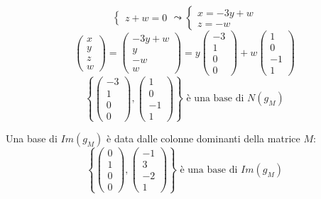 \documentclass[a4paper]{article}
\theoremstyle{break}
\theoremstyle{break}
\theoremstyle{break}
\theoremstyle{break}
\begin{document}
\begin{enumerate}
\[\begin{cases}
        z + w = 0
      \end{cases}
      \leadsto
      \begin{cases}
        x = -3y + w \\
        z = -w
      \end{cases}
    \]
    \[
    \begin{pmatrix} 
      x\\
      y\\
      z\\
      w
    \end{pmatrix} 
    =
    \begin{pmatrix} 
      -3y + w\\
      y\\
      -w\\
      w
    \end{pmatrix} 
    =
    y \begin{pmatrix} 
      -3\\
      1\\
      0\\
      0
    \end{pmatrix}
    + w \begin{pmatrix} 
      1\\
      0\\
      -1\\
      1
    \end{pmatrix}
    \] 
    \[
    \left\{ 
      \begin{pmatrix} -3\\1\\0\\0 \end{pmatrix} ,
      \begin{pmatrix} 1\\0\\-1\\1 \end{pmatrix}
    \right\} 
    \text{ è una base di } N(g_M)
    \] 

    \vspace{2em}
    \noindent Una base di \( Im(g_M) \) è data dalle colonne dominanti della matrice \( M \):
    \[
    \left\{ 
      \begin{pmatrix} 0\\1\\0\\0 \end{pmatrix} ,
      \begin{pmatrix} -1\\3\\-2\\1 \end{pmatrix} 
    \right\} 
    \text{ è una base di } Im(g_M)
    \] 


\end{enumerate}
\end{document}

